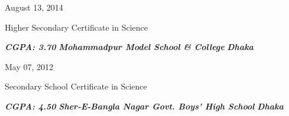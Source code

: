 \documentclass[a4paper,10pt]{article}
\newlength{\cvcolumngapwidth}
\newlength{\cvleftcolumnwidth}
\newlength{\cvrightcolumnwidth}
\newcommand{\cvsectionstyle}[1]{{\normalsize\cvsectionfont\textcolor{cvsectioncolor}{#1}}}
\newcommand{\cvtitlestyle}[1]{{\large\cvtitlefont\textcolor{cvtitlecolor}{#1}}}
\newcommand{\cvdurationstyle}[1]{{\small\cvdurationfont\textcolor{cvdurationcolor}{#1}}}
\newlength{\cvafteritemskipamount}
\newlength{\cvaftersectionskipamount}
\newlength{\cvbetweensectionandheadingextraskipamount}
\newlength{\cvaftertitleskipamount}
\newlength{\cvparskip}
\newcommand{\cvsection}[1]{
    \begin{minipage}[t]{\cvleftcolumnwidth}
        \raggedleft\cvsectionstyle{#1}
    \end{minipage}%
    \hspace{\cvcolumngapwidth}%
    \begin{minipage}[t]{\cvrightcolumnwidth}
        \textcolor{cvrulecolor}{\rule{\cvrightcolumnwidth}{0.3mm}}
    \end{minipage}

    \vspace{\cvaftersectionskipamount}
}
\newcommand{\cvitem}[2]{
    \begin{minipage}[t]{\cvleftcolumnwidth}
        \raggedleft #1
    \end{minipage}%
    \hspace{\cvcolumngapwidth}%
    \begin{minipage}[t]{\cvrightcolumnwidth}
        \setlength{\parskip}{\cvparskip} #2
    \end{minipage}

    \vspace{\cvafteritemskipamount}
}
\newcommand{\cvtitle}[1]{
    \cvtitlestyle{#1}

    \vspace{\cvaftertitleskipamount}
    \vspace{-\cvparskip}
}
\begin{document}
\cvitem{
    \cvdurationstyle{August 13, 2014 }
}{
    \cvtitle{Higher Secondary Certificate in Science}

    \textcolor{cvwhatcolor}{\emph{\textbf{CGPA: 3.70}}}
    \textcolor{cvwherecolor}{\textbf{\textbar}}
    \textcolor{cvwherecolor}{\emph{\textbf{Mohammadpur Model School \& College}}}
     \textcolor{cvwherecolor}{\textbf{\textbar}}
     \textcolor{cvwherecolor}{\emph{\textbf{Dhaka}}}

}
\cvitem{
    \cvdurationstyle{May 07, 2012}
}{
    \cvtitle{Secondary School Certificate in Science}

    \textcolor{cvwhatcolor}{\emph{\textbf{CGPA: 4.50}}}
    \textcolor{cvwherecolor}{\textbf{\textbar}}
    \textcolor{cvwherecolor}{\emph{\textbf{Sher-E-Bangla Nagar Govt. Boys' High School}}}
     \textcolor{cvwherecolor}{\textbf{\textbar}}
     \textcolor{cvwherecolor}{\emph{\textbf{Dhaka}}}


}




\end{document}
